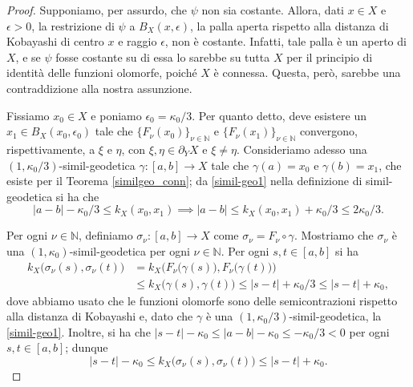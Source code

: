 \begin{proof}
    Supponiamo, per assurdo, che $\psi$ non sia costante. Allora, dati $x \in X$ e $\epsilon>0$, la restrizione di $\psi$ a $B_X(x,\epsilon)$, la palla aperta rispetto alla distanza di Kobayashi di centro $x$ e raggio $\epsilon$, non è costante. Infatti, tale palla è un aperto di $X$, e se $\psi$ fosse costante su di essa lo sarebbe su tutta $X$ per il principio di identità delle funzioni olomorfe, poiché $X$ è connessa. Questa, però, sarebbe una contraddizione alla nostra assunzione.

    Fissiamo $x_0 \in X$ e poniamo $\epsilon_0=\kappa_0/3$. Per quanto detto, deve esistere un $x_1 \in B_X(x_0,\epsilon_0)$ tale che $\{F_\nu(x_0)\}_{\nu\in\mathbb{N}}$ e $\{F_\nu(x_1)\}_{\nu\in\mathbb{N}}$ convergono, rispettivamente, a $\xi$ e $\eta$, con $\xi,\eta \in \partial_YX$ e $\xi\not=\eta$. Consideriamo adesso una $(1,\kappa_0/3)$-simil-geodetica $\gamma:[a,b]\longrightarrow X$ tale che $\gamma(a)=x_0$ e $\gamma(b)=x_1$, che esiste per il Teorema \ref{similgeo_conn}; da \eqref{simil-geo1} nella definizione di simil-geodetica si ha che
    $$|a-b|-\kappa_0/3 \le k_X(x_0,x_1) \implies |a-b| \le k_X(x_0,x_1)+\kappa_0/3 \le 2\kappa_0/3.$$

    Per ogni $\nu\in\mathbb{N}$, definiamo $\sigma_\nu:[a,b]\longrightarrow X$ come $\sigma_\nu=F_\nu\circ\gamma$. Mostriamo che $\sigma_\nu$ è una $(1,\kappa_0)$-simil-geodetica per ogni $\nu\in\mathbb{N}$. Per ogni $s,t \in [a,b]$ si ha
    \begin{align*}k_X\big(\sigma_\nu(s),\sigma_\nu(t)\big)&=k_X\Big(F_\nu\big(\gamma(s)\big),F_\nu\big(\gamma(t)\big)\Big)\\
        &\le k_X\big(\gamma(s),\gamma(t)\big) \le |s-t|+\kappa_0/3 \le |s-t|+\kappa_0,
    \end{align*}
    dove abbiamo usato che le funzioni olomorfe sono delle semicontrazioni rispetto alla distanza di Kobayashi e, dato che $\gamma$ è una $(1,\kappa_0/3)$-simil-geodetica, la \eqref{simil-geo1}. Inoltre, si ha che $|s-t|-\kappa_0 \le |a-b|-\kappa_0 \le -\kappa_0/3<0$ per ogni $s,t \in [a,b]$; dunque
    \begin{equation} \label{snu1}
        |s-t|-\kappa_0 \le k_X\big(\sigma_\nu(s),\sigma_\nu(t)\big) \le |s-t|+\kappa_0.
    \end{equation}


\end{proof}
